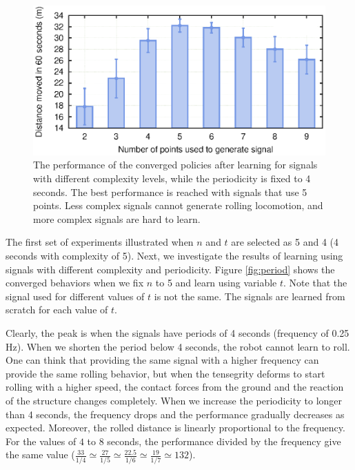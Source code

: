 \documentclass[twocolumn,10pt]{asme2ej}
\begin{document}
\begin{figure}[t]
\centering
\includegraphics[width=\columnwidth]{results/complexity/complexity.eps}
\caption{The performance of the converged policies after learning for signals with different complexity levels, while the periodicity is fixed to 4 seconds. The best performance is reached with signals that use 5 points. Less complex signals cannot generate rolling locomotion, and more complex signals are hard to learn.}
\label{fig:complexity}
\end{figure}

The first set of experiments illustrated when $n$ and $t$ are selected as 5 and 4 (4 seconds with complexity of 5). Next, we investigate the results of learning using signals with different complexity and periodicity. Figure \ref{fig:period} shows the converged behaviors when we fix  $n$ to 5 and learn using variable $t$. Note that the signal used for different values of $t$ is not the same. The signals are learned from scratch for each value of $t$. 

Clearly, the peak is when the signals have periods of 4 seconds (frequency of 0.25 Hz). When we shorten the period below 4 seconds, the robot cannot learn to roll. One can think that providing the same signal with a higher frequency can provide the same rolling behavior, but when the tensegrity deforms to start rolling with a higher speed, the contact forces from the ground and the reaction of the structure changes completely. When we increase the periodicity to longer than 4 seconds, the frequency drops and the performance gradually decreases as expected. Moreover,  the rolled distance is linearly proportional to the frequency. For the values of $4$ to $8$ seconds, the performance divided by the frequency give the same value ($\frac{33}{1/4} \simeq \frac{27}{1/5} \simeq \frac{22.5}{1/6} \simeq \frac{19}{1/7} \simeq 132 $). 
\end{document}
